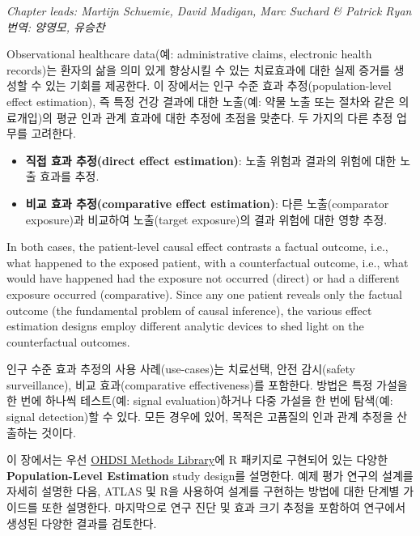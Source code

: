 \documentclass[]{book}
\providecommand{\tightlist}{%
  \setlength{\itemsep}{0pt}\setlength{\parskip}{0pt}}
\begin{document}
\emph{Chapter leads: Martijn Schuemie, David Madigan, Marc Suchard \& Patrick Ryan}
\emph{번역: 양영모, 유승찬}


Observational healthcare data(예: administrative claims, electronic health records)는 환자의 삶을 의미 있게 향상시킬 수 있는 치료효과에 대한 실제 증거를 생성할 수 있는 기회를 제공한다. 이 장에서는 인구 수준 효과 추정(population-level effect estimation), 즉 특정 건강 결과에 대한 노출(예: 약물 노출 또는 절차와 같은 의료개입)의 평균 인과 관계 효과에 대한 추정에 초점을 맞춘다. 두 가지의 다른 추정 업무를 고려한다.

\begin{itemize}
\tightlist
\item
  \textbf{직접 효과 추정(direct effect estimation)}: 노출 위험과 결과의 위험에 대한 노출 효과를 추정. 
\item
  \textbf{비교 효과 추정(comparative effect estimation)}: 다른 노출(comparator exposure)과 비교하여 노출(target exposure)의 결과 위험에 대한 영향 추정. 
\end{itemize}

In both cases, the patient-level causal effect contrasts a factual outcome, i.e., what happened to the exposed patient, with a counterfactual outcome, i.e., what would have happened had the exposure not occurred (direct) or had a different exposure occurred (comparative). Since any one patient reveals only the factual outcome (the fundamental problem of causal inference), the various effect estimation designs employ different analytic devices to shed light on the counterfactual outcomes. 

인구 수준 효과 추정의 사용 사례(use-cases)는 치료선택, 안전 감시(safety surveillance), 비교 효과(comparative effectiveness)를 포함한다. 방법은 특정 가설을 한 번에 하나씩 테스트(예: signal evaluation)하거나 다중 가설을 한 번에 탐색(예: signal detection)할 수 있다. 모든 경우에 있어, 목적은 고품질의 인과 관계 추정을 산출하는 것이다.  

이 장에서는 우선 \href{https://ohdsi.github.io/MethodsLibrary/}{OHDSI Methods Library}에 R 패키지로 구현되어 있는 다양한 \textbf{Population-Level Estimation} study design를 설명한다. 예제 평가 연구의 설계를 자세히 설명한 다음, ATLAS 및 R을 사용하여 설계를 구현하는 방법에 대한 단계별 가이드를 또한 설명한다.
마지막으로 연구 진단 및 효과 크기 추정을 포함하여 연구에서 생성된 다양한 결과를 검토한다.
\end{document}
